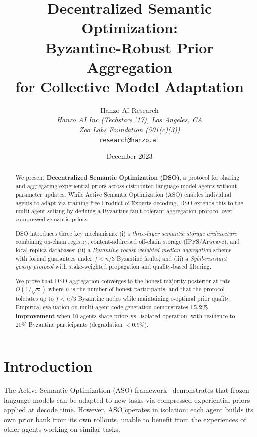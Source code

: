 \documentclass[11pt]{article}
\title{Decentralized Semantic Optimization:\\Byzantine-Robust Prior Aggregation\\for Collective Model Adaptation}
\author{
    Hanzo AI Research\\
    \textit{Hanzo AI Inc (Techstars '17), Los Angeles, CA}\\
    \textit{Zoo Labs Foundation (501(c)(3))}\\
    \texttt{research@hanzo.ai}
}
\date{December 2023}
\begin{document}
\luxcoverpage

\begin{abstract}
We present \textbf{Decentralized Semantic Optimization (DSO)}, a protocol for
sharing and aggregating experiential priors across distributed language model
agents without parameter updates. While Active Semantic Optimization (ASO)
enables individual agents to adapt via training-free Product-of-Experts
decoding, DSO extends this to the multi-agent setting by defining a
Byzantine-fault-tolerant aggregation protocol over compressed semantic priors.

DSO introduces three key mechanisms: (i) a \emph{three-layer semantic storage
architecture} combining on-chain registry, content-addressed off-chain storage
(IPFS/Arweave), and local replica databases; (ii) a \emph{Byzantine-robust
weighted median aggregation} scheme with formal guarantees under $f < n/3$
Byzantine faults; and (iii) a \emph{Sybil-resistant gossip protocol} with
stake-weighted propagation and quality-based filtering.

We prove that DSO aggregation converges to the honest-majority posterior at rate
$O(1/\sqrt{n})$ where $n$ is the number of honest participants, and that the
protocol tolerates up to $f < n/3$ Byzantine nodes while maintaining
$\varepsilon$-optimal prior quality. Empirical evaluation on multi-agent code
generation demonstrates \textbf{15.2\% improvement} when 10 agents share priors
vs.\ isolated operation, with resilience to 20\% Byzantine participants
(degradation $< 0.9\%$).
\end{abstract}

\section{Introduction}
\label{sec:intro}

The Active Semantic Optimization (ASO) framework~\cite{hanzo2026aso}
demonstrates that frozen language models can be adapted to new tasks via
compressed experiential priors applied at decode time. However, ASO operates in
isolation: each agent builds its own prior bank from its own rollouts, unable to
benefit from the experiences of other agents working on similar tasks.
\end{document}
